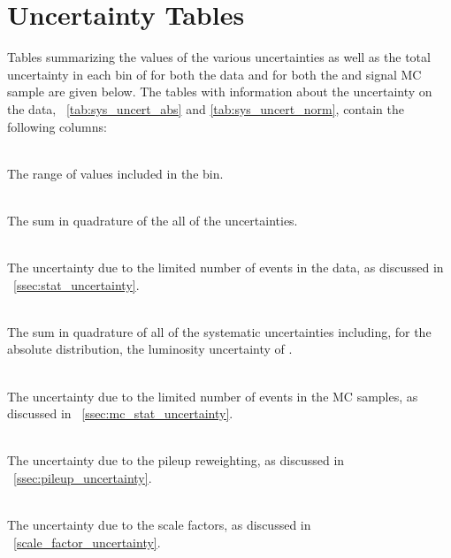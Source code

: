 
\section{Uncertainty Tables}

Tables summarizing the values of the various uncertainties as well as the total
uncertainty in each bin of \phistar for both the data and for both the
\MADGRAPH and \POWHEG signal MC sample are given below. The tables with
information about the uncertainty on the data, \TABS~\ref{tab:sys_uncert_abs}
and \ref{tab:sys_uncert_norm}, contain the following columns:

\begin{description}[noitemsep]

    \item[\phistar Range:] \hfill \\
        The range of \phistar values included in the bin.

    \item[Total Uncertainty (Total):] \hfill \\
        The sum in quadrature of the all of the uncertainties.

    \item[Statistical Uncertainty (Stat.):] \hfill \\
        The uncertainty due to the limited number of events in the data, as
        discussed in \SEC~\ref{ssec:stat_uncertainty}.

    \item[Total Systematic Uncertainty (Total Syst.):] \hfill \\
        The sum in quadrature of all of the systematic uncertainties including,
        for the absolute distribution, the luminosity uncertainty of
        \LumiUncertainty.

    \item[Monte Carlo Statistical Uncertainty (MC Stat.):] \hfill \\
        The uncertainty due to the limited number of events in the MC samples,
        as discussed in \SEC~\ref{ssec:mc_stat_uncertainty}.

    \item[Pileup Uncertainty (Pileup):] \hfill \\
        The uncertainty due to the pileup reweighting, as discussed in
        \SEC~\ref{ssec:pileup_uncertainty}.

    \item[Scale Factor Uncertainty (SF):] \hfill \\
        The uncertainty due to the scale factors, as discussed in
        \SEC~\ref{scale_factor_uncertainty}.


\end{description}
